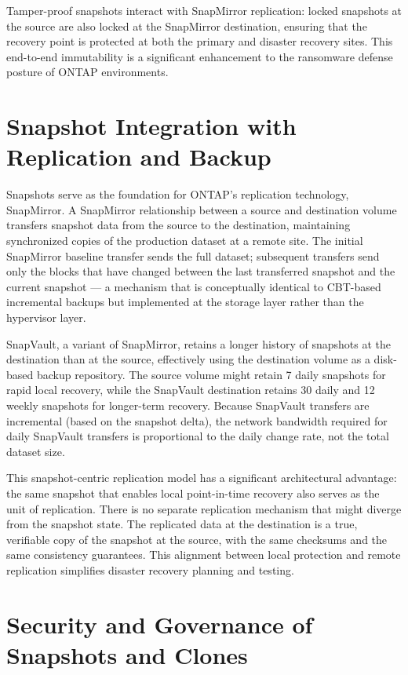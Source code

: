 Tamper-proof snapshots interact with SnapMirror replication: locked snapshots at the source are also locked at the SnapMirror destination, ensuring that the recovery point is protected at both the primary and disaster recovery sites. This end-to-end immutability is a significant enhancement to the ransomware defense posture of ONTAP environments.

\section{Snapshot Integration with Replication and Backup}

Snapshots serve as the foundation for ONTAP's replication technology, SnapMirror. A SnapMirror relationship between a source and destination volume transfers snapshot data from the source to the destination, maintaining synchronized copies of the production dataset at a remote site. The initial SnapMirror baseline transfer sends the full dataset; subsequent transfers send only the blocks that have changed between the last transferred snapshot and the current snapshot --- a mechanism that is conceptually identical to CBT-based incremental backups but implemented at the storage layer rather than the hypervisor layer.

SnapVault, a variant of SnapMirror, retains a longer history of snapshots at the destination than at the source, effectively using the destination volume as a disk-based backup repository. The source volume might retain 7 daily snapshots for rapid local recovery, while the SnapVault destination retains 30 daily and 12 weekly snapshots for longer-term recovery. Because SnapVault transfers are incremental (based on the snapshot delta), the network bandwidth required for daily SnapVault transfers is proportional to the daily change rate, not the total dataset size.

This snapshot-centric replication model has a significant architectural advantage: the same snapshot that enables local point-in-time recovery also serves as the unit of replication. There is no separate replication mechanism that might diverge from the snapshot state. The replicated data at the destination is a true, verifiable copy of the snapshot at the source, with the same checksums and the same consistency guarantees. This alignment between local protection and remote replication simplifies disaster recovery planning and testing.

\section{Security and Governance of Snapshots and Clones}

